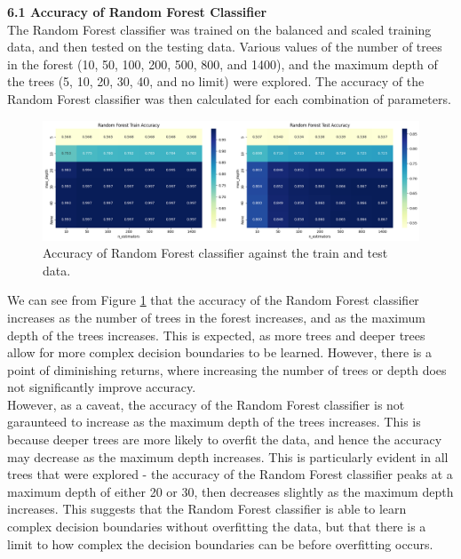 \documentclass[12pt]{article}
\begin{document}
\vspace{20pt}

\textbf{6.1 Accuracy of Random Forest Classifier}
\\
The Random Forest classifier was trained on the balanced and scaled training data, and then tested on the testing data. Various values of the number of trees in the forest (10, 50, 100, 200, 500, 800, and 1400), and the maximum depth of the trees (5, 10, 20, 30, 40, and no limit) were explored. The accuracy of the Random Forest classifier was then calculated for each combination of parameters.

\begin{figure}[H]
\centering
\includegraphics[width=1.0\textwidth]{figures/rf_accuracy.png}
\caption{Accuracy of Random Forest classifier against the train and test data.}
\label{fig:rf_accuracy}
\end{figure}

We can see from Figure \ref{fig:rf_accuracy} that the accuracy of the Random Forest classifier increases as the number of trees in the forest increases, and as the maximum depth of the trees increases. This is expected, as more trees and deeper trees allow for more complex decision boundaries to be learned. However, there is a point of diminishing returns, where increasing the number of trees or depth does not significantly improve accuracy.
\\
However, as a caveat, the accuracy of the Random Forest classifier is not garaunteed to increase as the maximum depth of the trees increases. This is because deeper trees are more likely to overfit the data, and hence the accuracy may decrease as the maximum depth increases. This is particularly evident in all trees that were explored - the accuracy of the Random Forest classifier peaks at a maximum depth of either 20 or 30, then decreases slightly as the maximum depth increases. This suggests that the Random Forest classifier is able to learn complex decision boundaries without overfitting the data, but that there is a limit to how complex the decision boundaries can be before overfitting occurs.
\end{document}
